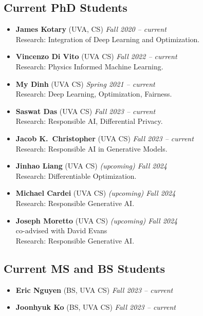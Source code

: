 \subsection*{Current PhD Students}
\begin{itemize}
  \item \textbf{James Kotary} ({\sc UVA}, CS) 
  \hfill{\em Fall 2020 -- current}\\
  {\sc Research}: Integration of Deep Learning and Optimization.

  \item \textbf{Vincenzo Di Vito} ({\sc UVA} CS)
  \hfill{\em Fall 2022 -- current}\\
  {\sc Research:} Physics Informed Machine Learning.
  
  \item \textbf{My Dinh} ({\sc UVA} CS) 
  \hfill{\em Spring 2021 -- current}\\
  {\sc Research}: Deep Learning, Optimization, Fairness.

  \item \textbf{Saswat Das} ({\sc UVA} CS)
  \hfill{\em Fall 2023 -- current}\\
  {\sc Research:} Responsible AI, Differential Privacy.

  \item \textbf{Jacob K.~Christopher} ({\sc UVA} CS)
  \hfill{\em Fall 2023 -- current}\\
  {\sc Research:} Responsible AI in Generative Models.

  \item \textbf{Jinhao Liang} ({\sc UVA} CS)
  \hfill{\em (upcoming) Fall 2024}\\
  {\sc Research:} Differentiable Optimization.

  \item \textbf{Michael Cardei} ({\sc UVA} CS)
  \hfill{\em (upcoming) Fall 2024}\\
  {\sc Research:} Responsible Generative AI.

  \item \textbf{Joseph Moretto} ({\sc UVA} CS)
  \hfill{\em (upcoming) Fall 2024}\\
  co-advised with David Evans\\
  {\sc Research:} Responsible Generative AI.
\end{itemize}

\subsection*{Current MS and BS Students}
\begin{itemize}
  \item  \textbf{Eric Nguyen} ({\sc BS, UVA} CS) 
    \hfill{\em Fall 2023 -- current}
  \item  \textbf{Joonhyuk Ko} ({\sc BS, UVA} CS) 
    \hfill{\em Fall 2023 -- current}
\end{itemize}

